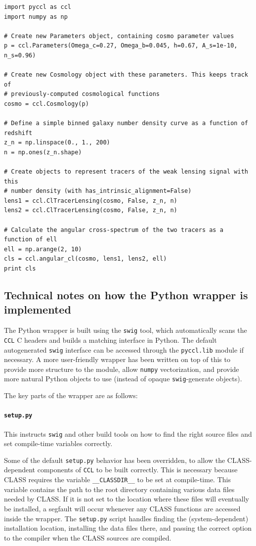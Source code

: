 \documentclass[\docopts]{\docclass}
\begin{document}
\begin{verbatim}
import pyccl as ccl
import numpy as np

# Create new Parameters object, containing cosmo parameter values
p = ccl.Parameters(Omega_c=0.27, Omega_b=0.045, h=0.67, A_s=1e-10, n_s=0.96)

# Create new Cosmology object with these parameters. This keeps track of 
# previously-computed cosmological functions
cosmo = ccl.Cosmology(p)

# Define a simple binned galaxy number density curve as a function of redshift
z_n = np.linspace(0., 1., 200)
n = np.ones(z_n.shape)

# Create objects to represent tracers of the weak lensing signal with this 
# number density (with has_intrinsic_alignment=False)
lens1 = ccl.ClTracerLensing(cosmo, False, z_n, n)
lens2 = ccl.ClTracerLensing(cosmo, False, z_n, n)

# Calculate the angular cross-spectrum of the two tracers as a function of ell
ell = np.arange(2, 10)
cls = ccl.angular_cl(cosmo, lens1, lens2, ell)
print cls
\end{verbatim}

\subsection{Technical notes on how the Python wrapper is implemented}
\label{sec:python:technical}

The Python wrapper is built using the {\tt swig} tool, which automatically scans the {\tt CCL} C headers and builds a matching interface in Python. The default autogenerated {\tt swig} interface can be accessed through the {\tt pyccl.lib} module if necessary. A more user-friendly wrapper has been written on top of this to provide more structure to the module, allow {\tt numpy} vectorization, and provide more natural Python objects to use (instead of opaque {\tt swig}-generate objects).

The key parts of the wrapper are as follows:
\paragraph{{\tt setup.py}} This instructs {\tt swig} and other build tools on how to find the right source files and set compile-time variables correctly.

Some of the default {\tt setup.py} behavior has been overridden, to allow the CLASS-dependent components of {\tt CCL} to be built correctly. This is necessary because CLASS requires the variable {\tt \_\_CLASSDIR\_\_} to be set at compile-time. This variable contains the path to the root directory containing various data files needed by CLASS. If it is not set to the location where these files will eventually be installed, a segfault will occur whenever any CLASS functions are accessed inside the wrapper. The {\tt setup.py} script handles finding the (system-dependent) installation location, installing the data files there, and passing the correct option to the compiler when the CLASS sources are compiled.
\end{document}
